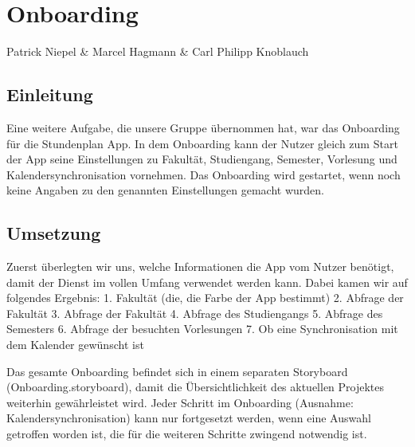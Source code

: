\chapter{Onboarding}
Patrick Niepel \& Marcel Hagmann \& Carl Philipp Knoblauch

\section{Einleitung}
Eine weitere Aufgabe, die unsere Gruppe übernommen hat, war das Onboarding für die Stundenplan App. In dem Onboarding kann der Nutzer gleich zum Start der App seine Einstellungen zu Fakultät, Studiengang, Semester, Vorlesung und Kalendersynchronisation vornehmen. Das Onboarding wird gestartet, wenn noch keine Angaben zu den genannten Einstellungen gemacht wurden.


\section{Umsetzung}
Zuerst überlegten wir uns, welche Informationen die App vom Nutzer benötigt, damit der Dienst im vollen Umfang verwendet werden kann.
Dabei kamen wir auf folgendes Ergebnis:
1. Fakultät (die, die Farbe der App bestimmt)
2. Abfrage der Fakultät
3. Abfrage der Fakultät
4. Abfrage des Studiengangs
5. Abfrage des Semesters
6. Abfrage der besuchten Vorlesungen
7. Ob eine Synchronisation mit dem Kalender gewünscht ist

Das gesamte Onboarding befindet sich in einem separaten Storyboard (Onboarding.storyboard), damit die Übersichtlichkeit des aktuellen Projektes weiterhin gewährleistet wird.
Jeder Schritt im Onboarding (Ausnahme: Kalendersynchronisation) kann nur fortgesetzt werden, wenn eine Auswahl getroffen worden ist, die für die weiteren Schritte zwingend notwendig ist.